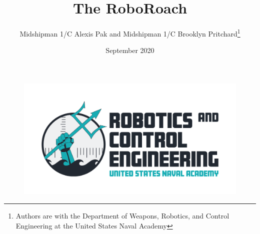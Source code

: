 \documentclass{article}
\title{The RoboRoach}
\author{Midshipman 1/C Alexis Pak and Midshipman 1/C Brooklyn Pritchard\thanks{Authors are with the Department of Weapons, Robotics, and Control Engineering at the United States Naval Academy}}
\begin{document}
\maketitle

\begin{figure}[ht!]
\centering
\includegraphics[scale=0.5]{logo.png}

\label{fig:logo}
\end{figure}



    \date{September 2020}

\tableofcontents
\end{document}
